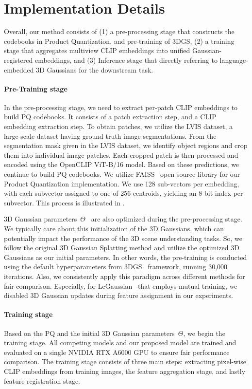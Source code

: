 \section{Implementation Details}
\label{sec:implementation}
Overall, our method consists of (1) a pre-processing stage that constructs the codebooks in Product Quantization, and pre-training of 3DGS, (2) a training stage that aggregates multiview CLIP embeddings into unified Gaussian-registered embeddings, and (3) Inference stage that directly referring to language-embedded 3D Gaussians for the downstream task.

\paragraph{Pre-Training stage} 
In the pre-processing stage, we need to extract per-patch CLIP embeddings to build PQ codebooks. 
It consists of a patch extraction step, and a CLIP embedding extraction step. 
To obtain patches, we utilize the LVIS dataset, a large-scale dataset having ground truth image segmentations. From the segmentation mask given in the LVIS dataset, we identify object regions and crop them into individual image patches. Each cropped patch is then processed and encoded using the OpenCLIP ViT-B/16 model. Based on these predictions, we continue to build PQ codebooks. We utilize FAISS~\cite{douze2024faiss} open-source library for our Product Quantization implementation.  
We use 128 sub-vectors per embedding, with each subvector assigned to one of 256 centroids, yielding an 8-bit index per subvector. This process is illustrated in .

3D Gaussian parameters~$\Theta$~\cite{3dgs} are also optimized during the pre-processing stage. We typically care about this initialization of the 3D Gaussians, which can potentially impact the performance of the 3D scene understanding tasks. So, we follow the original 3D Gaussian Splatting method and utilize the optimized 3D Gaussians as our initial parameters. In other words, the pre-training is conducted using the default hyperparameters from 3DGS~\cite{3dgs} framework, running 30,000 iterations. Also, we consistently apply this paradigm across different methods for fair comparison. Especially, for LeGaussian~\cite{legaussian} that employs mutual training, we disabled 3D Gaussian updates during feature assignment in our experiments. 

\paragraph{Training stage}
Based on the PQ and the initial 3D Gaussian parameters~$\Theta$, we begin the training stage. All competing models and our proposed model are trained and evaluated on a single NVIDIA RTX A6000 GPU to ensure fair performance comparison. The training stage consists of three main steps: extracting pixel-wise CLIP embeddings from training images, the feature aggregation stage, and lastly feature registration stage.

